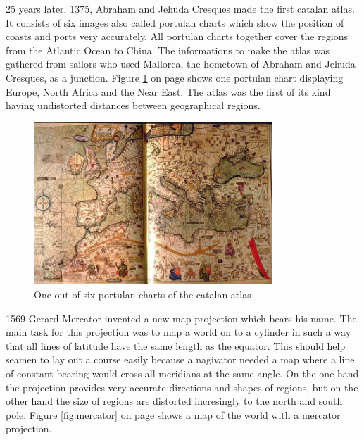 25 years later, 1375, Abraham and Jehuda Cresques made the first catalan atlas. It consists of six images also called portulan charts which show the position of coasts and ports very accurately. All portulan charts together cover the regions from the Atlantic Ocean to China. The informations to make the atlas was gathered from sailors who used Mallorca, the hometown of Abraham and Jehuda Cresques, as a junction. Figure \ref{fig:catalan-atlas} on page \pageref{fig:catalan-atlas} shows one portulan chart displaying Europe, North Africa and the Near East. The atlas was the first of its kind having undistorted distances between geographical regions.

\begin{figure}[h]
\centering
\includegraphics[width=0.8\textwidth,keepaspectratio]{images/history/catalan-atlas.jpg}
\caption[
    One out of six portulan charts of the catalan atlas, Urldate: 07.2016 \newline
\small\texttt{\url{http://datavis.ca/milestones//admin/uploads/images/CatalanE.jpg}}
]{One out of six portulan charts of the catalan atlas}
\label{fig:catalan-atlas}
\end{figure}

1569 Gerard Mercator invented a new map projection which bears his name. The main task for this projection was to map a world on to a cylinder in such a way that all lines of latitude have the same length as the equator. This should help seamen to lay out a course easily because a nagivator needed a map where a line of constant bearing would cross all meridians at the same angle. On the one hand the projection provides very accurate directions and shapes of regions, but on the other hand the size of regions are distorted incresingly to the north and south pole. Figure \ref{fig:mercator} on page \pageref{fig:mercator} shows a map of the world with a mercator projection.

